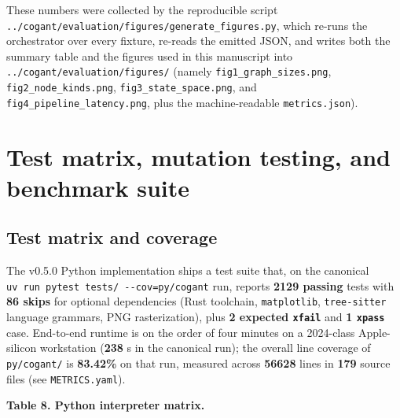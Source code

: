 \documentclass[
]{article}
\begin{document}
These numbers were collected by the reproducible script
\texttt{../cogant/evaluation/figures/generate\_figures.py}, which
re-runs the orchestrator over every fixture, re-reads the emitted JSON,
and writes both the summary table and the figures used in this
manuscript into \texttt{../cogant/evaluation/figures/} (namely
\texttt{fig1\_graph\_sizes.png}, \texttt{fig2\_node\_kinds.png},
\texttt{fig3\_state\_space.png}, and
\texttt{fig4\_pipeline\_latency.png}, plus the machine-readable
\texttt{metrics.json}).

\newpage

\section{Test matrix, mutation testing, and benchmark
suite}\label{test-matrix-mutation-testing-and-benchmark-suite}

\subsection{Test matrix and coverage}\label{test-matrix-and-coverage}

The v0.5.0 Python implementation ships a test suite that, on the
canonical \texttt{uv\ run\ pytest\ tests/\ -\/-cov=py/cogant} run,
reports \textbf{2129 passing} tests with \textbf{86 skips} for optional
dependencies (Rust toolchain, \texttt{matplotlib}, \texttt{tree-sitter}
language grammars, PNG rasterization), plus \textbf{2 expected
\texttt{xfail}} and \textbf{1 \texttt{xpass}} case. End-to-end runtime
is on the order of four minutes on a 2024-class Apple-silicon
workstation (\textbf{238} s in the canonical run); the overall line
coverage of \texttt{py/cogant/} is \textbf{83.42\%} on that run,
measured across \textbf{56628} lines in \textbf{179} source files (see
\texttt{METRICS.yaml}).

\textbf{Table 8. Python interpreter matrix.}
\end{document}
